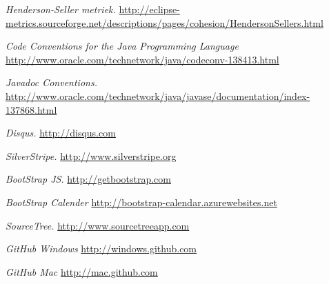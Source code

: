 \begin{thebibliography}{99}
	 \emph{Henderson-Seller metriek.} \url{http://eclipse-metrics.sourceforge.net/descriptions/pages/cohesion/HendersonSellers.html}
	
	 \emph{Code Conventions for the Java Programming Language} \url{http://www.oracle.com/technetwork/java/codeconv-138413.html}
	
	 \emph{Javadoc Conventions. } \url{http://www.oracle.com/technetwork/java/javase/documentation/index-137868.html}

	 \emph{Disqus.} \url{http://disqus.com}
	
	 \emph{SilverStripe.} \url{http://www.silverstripe.org}
	
	 \emph{BootStrap JS.} \url{http://getbootstrap.com}
	
	 \emph{BootStrap Calender} \url{http://bootstrap-calendar.azurewebsites.net}
	
	 \emph{SourceTree.} \url{http://www.sourcetreeapp.com}
	
	 \emph{GitHub Windows} \url{http://windows.github.com}
	
	 \emph{GitHub Mac} \url{http://mac.github.com}




\end{thebibliography}


\endgroup
